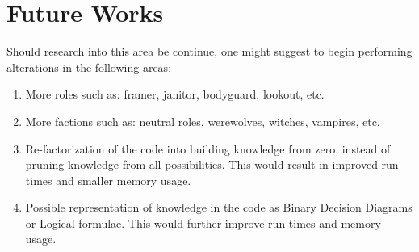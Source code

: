 \section{Future Works}\label{sec:future-works}
Should research into this area be continue, one might suggest to begin
performing alterations in the following areas:
\begin{enumerate}
	\item More roles such as: framer, janitor, bodyguard, lookout, etc.
	\item More factions such as: neutral roles, werewolves, witches, vampires, etc.
	\item Re-factorization of the code into building knowledge from zero, instead of
	      pruning knowledge from all possibilities. This would result in improved run
	      times and smaller memory usage.
	\item Possible representation of knowledge in the code as Binary Decision Diagrams or
	      Logical formulae. This would further improve run times and memory usage.
\end{enumerate}